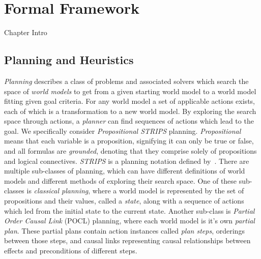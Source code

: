 \chapter{Formal Framework}\label{chap:framework}

Chapter Intro


\section{Planning and Heuristics}


\textit{Planning} describes a class of problems and associated solvers which search the space of \textit{world models} to get from a given starting world model to a world model fitting given goal criteria. For any world model a set of applicable actions exists, each of which is a transformation to a new world model. By exploring the search space through actions, a \textit{planner} can find sequences of actions which lead to the goal. We specifically consider \textit{Propositional STRIPS} planning. \textit{Propositional} means that each variable is a proposition, signifying it can only be true or false, and all formulas are \textit{grounded}, denoting that they comprise solely of propositions and logical connectives. \textit{STRIPS} is a planning notation defined by~\cite{STRIPS: A NEW APPROACH TO THE APPLICATION OF THEOREM PROVING TO PROBLEM SOLVING}. There are multiple sub-classes of planning, which can have different definitions of world models and different methods of exploring their search space. One of these sub-classes is \textit{classical planning}, where a world model is represented by the set of propositions and their values, called a \textit{state}, along with a sequence of actions which led from the initial state to the current state. Another sub-class is \textit{Partial Order Causal Link} (POCL) planning, where each world model is it's own \textit{partial plan}. These partial plans contain action instances called \textit{plan steps}, orderings between those steps, and causal links representing causal relationships between effects and preconditions of different steps.\\


